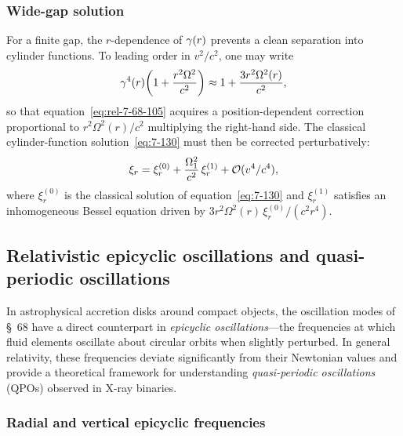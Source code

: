 \subsubsection{Wide-gap solution}

For a finite gap, the $r$-dependence of $\gamma(r)$ prevents a clean
separation into cylinder functions.  To leading order in $v^2/c^2$, one
may write
\begin{equation}
\label{eq:rel-7-68-widegap}
\gamma^4(r)\!\left(1 + \frac{r^2\Omega^2}{c^2}\right)
\approx 1 + \frac{3r^2\Omega^2(r)}{c^2},
\end{equation}
so that equation~\eqref{eq:rel-7-68-105} acquires a
position-dependent correction proportional to $r^2\Omega^2(r)/c^2$
multiplying the right-hand side.  The classical cylinder-function
solution~\eqref{eq:7-130} must then be corrected perturbatively:
\begin{equation}
\label{eq:rel-7-68-130-pert}
\xi_r = \xi_r^{(0)} + \frac{\Omega_1^2}{c^2}\,\xi_r^{(1)}
+ \mathcal{O}(v^4/c^4),
\end{equation}
where $\xi_r^{(0)}$ is the classical solution of
equation~\eqref{eq:7-130} and $\xi_r^{(1)}$ satisfies
an inhomogeneous Bessel equation driven by
$3r^2\Omega^2(r)\,\xi_r^{(0)}/(c^2 r^4)$.

\subsection{Relativistic epicyclic oscillations and quasi-periodic oscillations}
\label{sec:rel-7-68-epicyclic}

In astrophysical accretion disks around compact objects, the oscillation
modes of \S~68 have a direct counterpart in \emph{epicyclic
oscillations}---the frequencies at which fluid elements oscillate about
circular orbits when slightly perturbed.  In general relativity, these
frequencies deviate significantly from their Newtonian values and
provide a theoretical framework for understanding
\emph{quasi-periodic oscillations} (QPOs) observed in X-ray binaries.

\subsubsection{Radial and vertical epicyclic frequencies}

